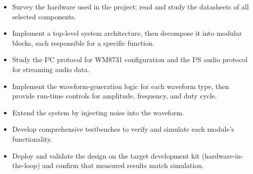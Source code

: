 \begin{itemize}[label=-]
	\item Survey the hardware used in the project; read and study the datasheets of all selected components.
	\item Implement a top-level system architecture, then decompose it into modular blocks, each responsible for a specific function.
	\item Study the I²C protocol for WM8731 configuration and the I²S audio protocol for streaming audio data.
	\item Implement the waveform-generation logic for each waveform type, then provide run-time controls for amplitude, frequency, and duty cycle.
	\item Extend the system by injecting noise into the waveform.
	\item Develop comprehensive testbenches to verify and simulate each module’s functionality.
	\item Deploy and validate the design on the target development kit (hardware-in-the-loop) and confirm that measured results match simulation.
\end{itemize}